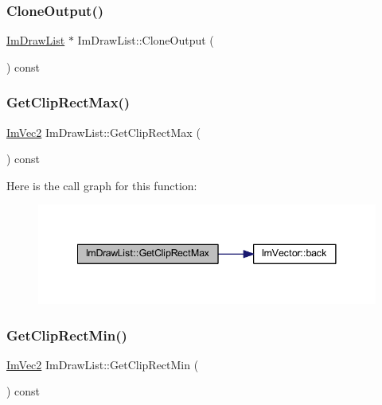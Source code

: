 \subsubsection{\texorpdfstring{Clone\+Output()}{CloneOutput()}}
{\footnotesize\ttfamily \mbox{\hyperlink{struct_im_draw_list}{Im\+Draw\+List}} $\ast$ Im\+Draw\+List\+::\+Clone\+Output (\begin{DoxyParamCaption}{ }\end{DoxyParamCaption}) const}

\mbox{\label{struct_im_draw_list_a8e484a61eab501c1c1c416a8b45bb08e}} 
\subsubsection{\texorpdfstring{Get\+Clip\+Rect\+Max()}{GetClipRectMax()}}
{\footnotesize\ttfamily \mbox{\hyperlink{struct_im_vec2}{Im\+Vec2}} Im\+Draw\+List\+::\+Get\+Clip\+Rect\+Max (\begin{DoxyParamCaption}{ }\end{DoxyParamCaption}) const\hspace{0.3cm}{\ttfamily [inline]}}

Here is the call graph for this function\+:
\nopagebreak
\begin{figure}[H]
\begin{center}
\leavevmode
\includegraphics[width=341pt]{struct_im_draw_list_a8e484a61eab501c1c1c416a8b45bb08e_cgraph}
\end{center}
\end{figure}
\mbox{\label{struct_im_draw_list_a9d83896d3eb434a9e1072d56523a2754}} 
\subsubsection{\texorpdfstring{Get\+Clip\+Rect\+Min()}{GetClipRectMin()}}
{\footnotesize\ttfamily \mbox{\hyperlink{struct_im_vec2}{Im\+Vec2}} Im\+Draw\+List\+::\+Get\+Clip\+Rect\+Min (\begin{DoxyParamCaption}{ }\end{DoxyParamCaption}) const\hspace{0.3cm}{\ttfamily [inline]}}


